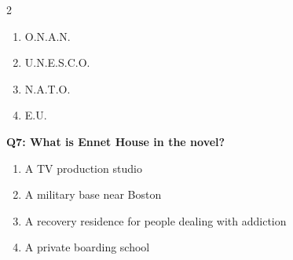 \documentclass[10pt]{article}
\begin{document}
\begin{multicols}{2}
\begin{enumerate}[label=\arabic*.]
\item O.N.A.N.
\item U.N.E.S.C.O.
\item N.A.T.O.
\item E.U.
\end{enumerate}
\textbf{Q7: What is Ennet House in the novel?}

\begin{enumerate}[label=\arabic*.]
\item A TV production studio
\item A military base near Boston
\item A recovery residence for people dealing with addiction
\item A private boarding school
\end{enumerate}
\end{multicols}

\newpage
\end{document}
